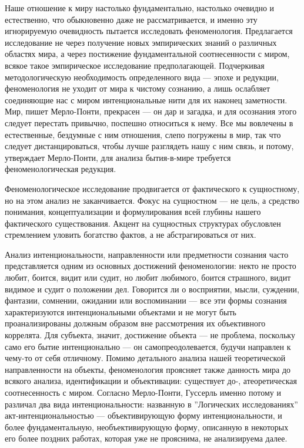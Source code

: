 \documentclass[11pt]{book}
\begin{document}
Наше отношение к миру настолько фундаментально, настолько очевидно и естественно, что обыкновенно даже не рассматривается, и именно эту игнорируемую очевидность пытается исследовать феноменология. Предлагается исследование не через получение новых эмпирических знаний о различных областях мира, а через постижение фундаментальной соотнесенности с миром, всякое такое эмпирическое исследование предполагающей. Подчеркивая методологическую необходимость определенного вида --- эпохе и редукции, феноменология не уходит от мира к чистому сознанию, а лишь ослабляет соединяющие нас с миром интенциональные нити для их наконец заметности. Мир, пишет Мерло-Понти, прекрасен --- он дар и загадка, и для осознания этого следует перестать привычно, поспешно относиться к нему. Все мы вовлечены в естественные, бездумные с ним отношения, слепо погружены в мир, так что следует дистанцироваться, чтобы лучше разглядеть нашу с ним связь, и потому, утверждает Мерло-Понти, для анализа бытия-в-мире требуется феноменологическая редукция.

Феноменологическое исследование продвигается от фактического к сущностному, но на этом анализ не заканчивается. Фокус на сущностном --- не цель, а средство понимания, концептуализации и формулирования всей глубины нашего фактического существования. Акцент на сущностных структурах обусловлен стремлением уловить богатство фактов, а не абстрагироваться от них.

Анализ интенциональности, направленности или предметности сознания часто представляется одним из основных достижений феноменологии: некто не просто любит, боится, видит или судит, но любит любимого, боится страшного, видит видимое и судит о положении дел. Говорится ли о восприятии, мысли, суждении, фантазии, сомнении, ожидании или воспоминании --- все эти формы сознания характеризуются интенциональными объектами и не могут быть проанализированы должным образом вне рассмотрения их объективного коррелята. Для субъекта, значит, достижение объекта --- не проблема, поскольку само его бытие интенционально --- он самопреодолевается, будучи направлен к чему-то от себя отличному. Помимо детального анализа нашей теоретической направленности на объекты, феноменология проясняет также данность мира до всякого анализа, идентификации и объективации: существует до-, атеоретическая соотнесенность с миром. Согласно Мерло-Понти, Гуссерль именно потому и различал два вида интенциональности: названную в ''Логических исследованиях'' акт-интенциональностью --- объективирующую форму интенциональности, и более фундаментальную, необъективирующую форму, описанную в некоторых его более поздних работах, которая уже не прояснима, не анализируема далее.
\end{document}
